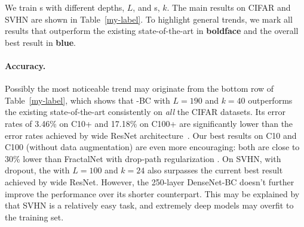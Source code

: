 We train \methodnameshort{}s with different depths, $L$, and \stepsizename{}s, $k$.
The main results on CIFAR and SVHN are shown in Table~\ref{my-label}.
To highlight general trends, we mark all results that outperform the existing state-of-the-art  in {\textbf{boldface}} and the overall best result in {\color{blue} \textbf{blue}}.

\vspace{-2 ex}
\paragraph{Accuracy.}
Possibly the most noticeable trend may originate from the bottom row of Table~\ref{my-label}, which shows that \methodnameshort{}-BC with $L\!=\!190$ and $k\!=\!40$ outperforms the existing state-of-the-art consistently on \emph{all} the CIFAR datasets. Its error rates of 3.46\% on C10+ and 17.18\% on C100+ are significantly lower than the error rates achieved by wide ResNet architecture~\cite{wide}. Our best results on C10 and C100 (without data augmentation) are even more encouraging: both are close to 30\% lower than FractalNet with drop-path regularization \cite{fractalnet}. On SVHN, with dropout, the \methodnameshort{} with $L\!=\!100$ and $k\!=\!24$ also surpasses the current best result achieved by wide ResNet. However, the 250-layer DenseNet-BC doesn't further improve the performance over its shorter counterpart. This may be explained by that SVHN is a relatively easy task, and extremely deep models may overfit to the training set.




\vspace{-2 ex}
